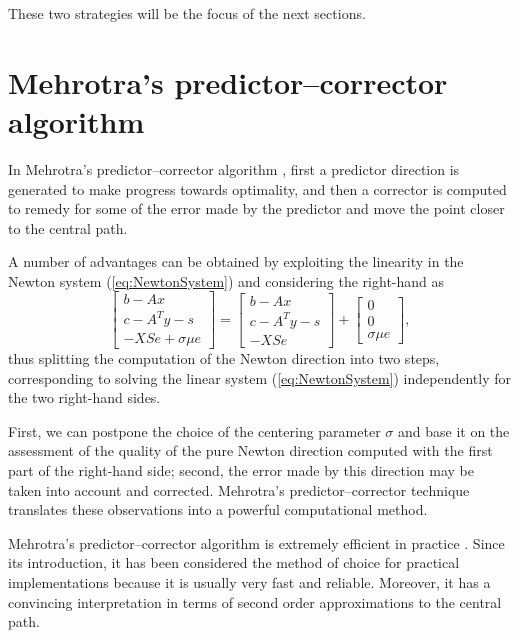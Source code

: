 These two strategies will be the focus of the next sections.


%
%
\section{Mehrotra's predictor--corrector algorithm}
\label{sec:MehrotraPC}

In Mehrotra's predictor--corrector algorithm \cite{Mehrotra92}, 
first a predictor direction is generated 
to make progress towards optimality, and then 
a corrector is computed to remedy for some of the error made by the predictor
and move the point closer to the central path.

A number of advantages can be obtained by exploiting the
linearity in the Newton system (\ref{eq:NewtonSystem}) and
considering the right-hand as
\[
 \left[ 
  \begin{array}{c}
    b-Ax \\ c-A^Ty-s \\ -XSe + \sigma\mu e
  \end{array} \right]
 = \left[ 
  \begin{array}{c}
    b-Ax \\ c-A^Ty-s \\ -XSe
  \end{array} \right]
 + \left[ 
  \begin{array}{c}
    0 \\ 0 \\ \sigma\mu e
  \end{array} \right],
\]
thus splitting the computation 
of the Newton direction into two steps, corresponding to solving the linear
system (\ref{eq:NewtonSystem}) independently for the two right-hand 
sides. 

First, we can postpone the choice of the centering parameter 
$\sigma$ and base it on the assessment of the quality of the 
pure Newton direction computed with the first part of the right-hand side;
second, the error made by this direction may be 
taken into account and
corrected. Mehrotra's predictor--corrector technique \cite{Mehrotra92}
translates these observations into a powerful computational method.

Mehrotra's predictor--corrector algorithm 
is extremely efficient in practice \cite{LustigMarstenShanno,Mehrotra92}. 
Since its introduction, it has 
been considered the method of choice for practical implementations 
because it is usually very fast and reliable. Moreover, it has a 
convincing interpretation in terms of second order approximations
to the central path.

